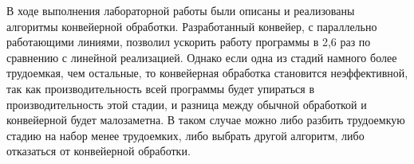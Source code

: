 \Conclusion
    В ходе выполнения лабораторной работы 
    были описаны и реализованы алгоритмы конвейерной обработки.
    Разработанный конвейер, с параллельно работающими линиями,
    позволил ускорить работу программы в 2,6 раз
    по сравнению с линейной реализацией. 
    Однако если одна из стадий намного более трудоемкая, чем остальные,
    то конвейерная обработка становится неэффективной,
    так как производительность всей программы будет упираться в производительность этой стадии,
    и разница между обычной обработкой и конвейерной будет малозаметна.
    В таком случае можно либо разбить трудоемкую стадию на набор менее трудоемких,
    либо выбрать другой алгоритм, либо отказаться от конвейерной обработки.
